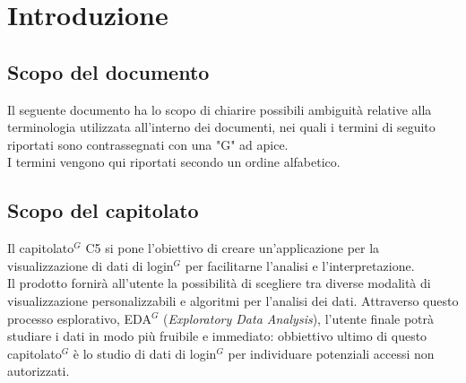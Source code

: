 \section{Introduzione}
\subsection{Scopo del documento}

Il seguente documento ha lo scopo di chiarire possibili ambiguità relative alla terminologia utilizzata all'interno dei documenti, nei quali i termini di seguito riportati sono contrassegnati con una "G" ad apice.\\
I termini vengono qui riportati secondo un ordine alfabetico.


\subsection{Scopo del capitolato}
Il capitolato$^{G}$ C5 si pone l'obiettivo di creare un'applicazione per la visualizzazione di dati
di login$^{G}$ per facilitarne l'analisi e l'interpretazione.\\
Il prodotto fornirà all'utente la possibilità di scegliere tra diverse modalità di visualizzazione personalizzabili 
e algoritmi per l'analisi dei dati. Attraverso questo processo esplorativo, EDA$^{G}$ (\textit{Exploratory Data Analysis}), 
l'utente finale potrà studiare i dati in modo più fruibile e immediato: obbiettivo ultimo di questo capitolato$^{G}$ 
è lo studio di dati di login$^{G}$ per individuare potenziali accessi non autorizzati.